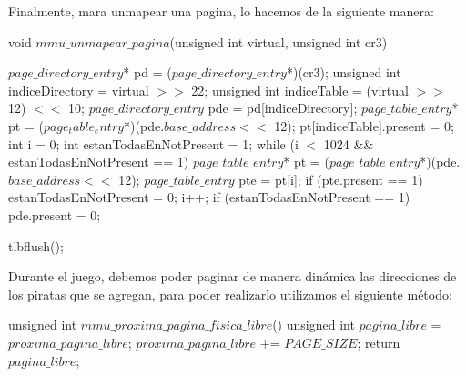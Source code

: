 Finalmente, mara unmapear una pagina, lo hacemos de la siguiente manera:
\begin{algorithmic}

\State \tab void $mmu\_unmapear\_pagina$(unsigned int virtual, unsigned int cr3) {
  \State \tab \tab $page\_directory\_entry$* pd = ($page\_directory\_entry$*)(cr3);
  \State \tab \tab unsigned int indiceDirectory = virtual $>>$ 22;
  \State \tab \tab unsigned int indiceTable = (virtual $>>$ 12) $<<$ 10;
  \State \tab \tab $page\_directory\_entry$ pde = pd[indiceDirectory];
  \State \tab \tab $page\_table\_entry$* pt = ($page_table_entry$*)(pde.$base\_address <<$ 12);
  \State \tab \tab pt[indiceTable].present = 0;
  \State \tab \tab int i = 0;
  \State \tab \tab int estanTodasEnNotPresent = 1;
  \State \tab \tab while (i $<$ 1024 $\&\&$ estanTodasEnNotPresent == 1) {
    \State \tab \tab \tab $page\_table\_entry$* pt = ($page\_table\_entry$*)(pde.$base\_address <<$ 12);
    \State \tab \tab \tab $page\_table\_entry$ pte = pt[i];
    \State \tab \tab \tab if (pte.present == 1) {
      \State \tab \tab \tab \tab estanTodasEnNotPresent = 0;
    \State \tab \tab \tab }
    \State \tab \tab \tab i++;
  \State \tab \tab }
  \State \tab \tab if (estanTodasEnNotPresent == 1) {
    \State \tab \tab \tab pde.present = 0;
  \State \tab \tab  }

  \State \tab \tab tlbflush();
\State \tab  }
\end{algorithmic}

Durante el juego, debemos poder paginar de manera din\'amica las direcciones de los piratas que se agregan, para poder realizarlo utilizamos el siguiente m\'etodo:
\begin{algorithmic}
    \State \tab unsigned int $mmu\_proxima\_pagina\_fisica\_libre$() {
  \State \tab \tab unsigned int $pagina\_libre$ = $proxima\_pagina\_libre$;
  \State \tab \tab $proxima\_pagina\_libre$ += $PAGE\_SIZE$;
  \State \tab \tab return $pagina\_libre$;
\State \tab }
\end{algorithmic}
















